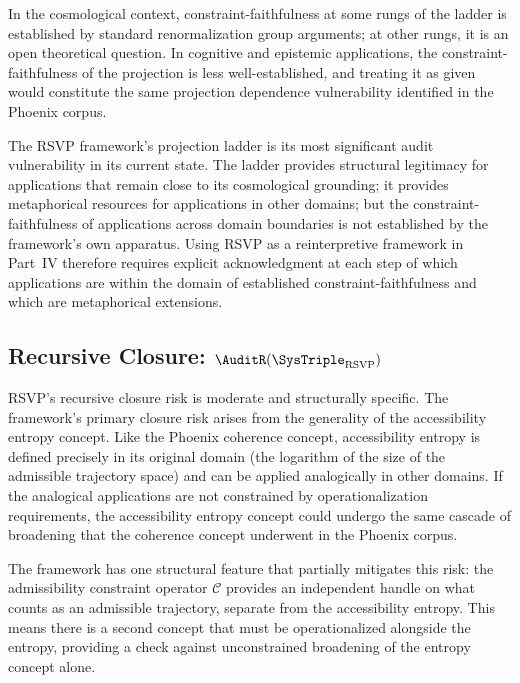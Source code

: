In the cosmological context, constraint-faithfulness
at some rungs of the ladder is established by standard
renormalization group arguments; at other rungs, it
is an open theoretical question. In cognitive and
epistemic applications, the constraint-faithfulness
of the projection is less well-established, and
treating it as given would constitute the same
projection dependence vulnerability identified in
the Phoenix corpus.

\begin{auditprop}
\label{ap:rsvp-projection}
The RSVP framework's projection ladder is its most
significant audit vulnerability in its current state.
The ladder provides structural legitimacy for
applications that remain close to its cosmological
grounding; it provides metaphorical resources for
applications in other domains; but the constraint-faithfulness
of applications across domain boundaries is not
established by the framework's own apparatus. Using
RSVP as a reinterpretive framework in Part~IV therefore
requires explicit acknowledgment at each step of which
applications are within the domain of established
constraint-faithfulness and which are metaphorical
extensions.
\end{auditprop}

\subsection{Recursive Closure: \texorpdfstring{$\AuditR(\SysTriple_{\mathrm{RSVP}})$}{R(Theta\_RSVP)}}

RSVP's recursive closure risk is moderate and structurally
specific. The framework's primary closure risk arises
from the generality of the accessibility entropy concept.
Like the Phoenix coherence concept, accessibility entropy
is defined precisely in its original domain (the logarithm
of the size of the admissible trajectory space) and
can be applied analogically in other domains. If the
analogical applications are not constrained by
operationalization requirements, the accessibility
entropy concept could undergo the same cascade of
broadening that the coherence concept underwent in
the Phoenix corpus.

The framework has one structural feature that partially
mitigates this risk: the admissibility constraint
operator $\mathcal{C}$ provides an independent handle
on what counts as an admissible trajectory, separate
from the accessibility entropy. This means there is
a second concept that must be operationalized alongside
the entropy, providing a check against unconstrained
broadening of the entropy concept alone.

